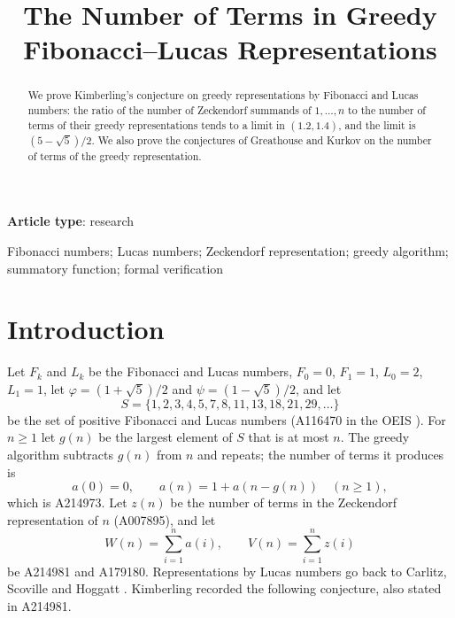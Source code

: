 \documentclass[]{interact}
\makeatletter
\newcommand{\monthyear}[1]{%
  \def\@monthyear{\uppercase{#1}}}
\newcommand{\volnumber}[1]{%
  \def\@volnumber{\uppercase{#1}}}
\theoremstyle{plain}
\numberwithin{equation}{section}
\theoremstyle{definition}
\makeatother
\begin{document}
\monthyear{Month Year}
\volnumber{Volume, Number}
\setcounter{page}{1}

\title{The Number of Terms in Greedy Fibonacci--Lucas Representations}

\author{
}

\maketitle

{\bf Article type}: research
\bigskip

\begin{abstract}
We prove Kimberling's conjecture on greedy representations by Fibonacci and Lucas numbers: the ratio of the number of Zeckendorf summands of $1,\dots,n$ to the number of terms of their greedy representations tends to a limit in $(1.2,1.4)$, and the limit is $(5-\sqrt5)/2$. We also prove the conjectures of Greathouse and Kurkov on the number of terms of the greedy representation.
\end{abstract}

\begin{keywords}
Fibonacci numbers; Lucas numbers; Zeckendorf representation; greedy algorithm; summatory function; formal verification
\end{keywords}

\section{Introduction}\label{sec:intro}

Let $F_k$ and $L_k$ be the Fibonacci and Lucas numbers, $F_0=0$, $F_1=1$, $L_0=2$, $L_1=1$, let $\varphi=(1+\sqrt5)/2$ and $\psi=(1-\sqrt5)/2$, and let
\[
S=\{1,2,3,4,5,7,8,11,13,18,21,29,\dots\}
\]
be the set of positive Fibonacci and Lucas numbers (A116470 in the OEIS \cite{OEIS}). For $n\ge 1$ let $g(n)$ be the largest element of $S$ that is at most $n$. The greedy algorithm subtracts $g(n)$ from $n$ and repeats; the number of terms it produces is
\[
a(0)=0,\qquad a(n)=1+a(n-g(n))\quad(n\ge1),
\]
which is A214973. Let $z(n)$ be the number of terms in the Zeckendorf representation of $n$ (A007895), and let
\[
W(n)=\sum_{i=1}^n a(i),\qquad V(n)=\sum_{i=1}^n z(i)
\]
be A214981 and A179180. Representations by Lucas numbers go back to Carlitz, Scoville and Hoggatt \cite{CSH72}. Kimberling \cite[Section~6]{Kim20} recorded the following conjecture, also stated in A214981.
\end{document}
